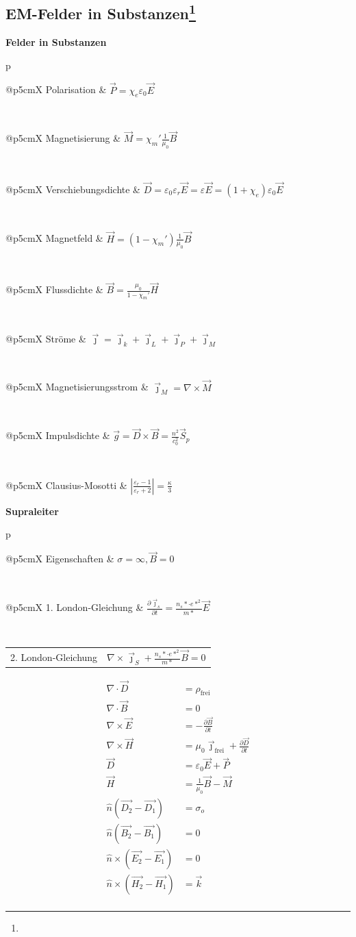 \documentclass[12pt,a4paper, twoside]{article}
\makeatletter
\newcommand{\abs}[1]{\left| #1 \right|}
\newcommand{\pd}[2]{\frac{\partial #1}{\partial #2}}
\renewcommand{\=}[1]{\stackrel{#1}{=}}
\newcommand{\js}{\vec \jmath}
\theoremstyle{definition}
\theoremstyle{remark}
\newcommand{\concept}[2]{%
\noindent
\begin{framed}
\noindent\textbf{#1}
\par\begin{tabular}{p{\linewidth}}
#2
\end{tabular}
\end{framed}
}
\newcommand{\f}[2]{%
\noindent\begin{tabularx}{\linewidth}{@{}p{5cm}X}
#1 & $#2$
\end{tabularx}}
\makeatother
\begin{document}
\subsection[EM-Felder in Substanzen]{EM-Felder in Substanzen\let\thefootnote\relax\footnote{}}


\concept{Felder in Substanzen}{

\f{Polarisation}{\vec P = \chi_e \varepsilon_0 \vec E}\\
\f{Magnetisierung}{\vec M = \chi_m' \frac{1}{\mu_0} \vec B}\\
\f{Verschiebungsdichte}{\vec D = \varepsilon_0 \varepsilon_r \vec E = \varepsilon \vec E = (1+\chi_e) \varepsilon_0 \vec E}\\
\f{Magnetfeld}{\vec H = (1-\chi_m') \frac{1}{\mu_0} \vec B}\\
\f{Flussdichte}{\vec B = \frac{\mu_0}{1-\chi_m'} \vec H}\\
\f{Ströme}{\js = \js_k + \js_L + \js_P + \js_M}\\
\f{Magnetisierungsstrom}{\js_M = \nabla \times \vec M}\\
\f{Impulsdichte}{\vec g = \vec D \times \vec B = \frac{n^2}{c_0^2} \vec S_p}\\
\f{Clausius-Mosotti}{\abs{\frac{\varepsilon_r - 1}{\varepsilon_r + 2}} = \frac{\kappa}{3}}

}

\concept{Supraleiter}{

\f{Eigenschaften}{\sigma = \infty, \vec B = 0}\\
\f{1. London-Gleichung}{\pd{\js_s}{t} = \frac{n_s* \cdot e*^2}{m*} \vec E}\\
\f{2. London-Gleichung}{\nabla \times \js_S + \frac{n_s* \cdot e*^2}{m*} \vec B = 0}
}

\begin{center}
\begin{framed}
\begin{align*}
\nabla \cdot \vec D &= \rho_{\text{frei}}\\
\nabla \cdot \vec B &= 0\\
\nabla \times \vec E &= - \pd{\vec{B}}{t}\\
\nabla \times \vec H &=  \mu_0 \vec \jmath_{\text{frei}} + \pd{\vec{D}}{t}\\
\vec D &= \varepsilon_0 \vec E + \vec P\\
\vec H &= \frac{1}{\mu_0} \vec B - \vec M\\
\hat n (\vec{D_2} - \vec{D_1}) &= \sigma_o\\
\hat n (\vec{B_2} - \vec{B_1}) &= 0\\
\hat n \times (\vec{E_2} - \vec{E_1}) &= 0\\
\hat n \times (\vec{H_2} - \vec{H_1}) &= \vec k\\
\end{align*}
\end{framed}
\end{center}
\end{document}
